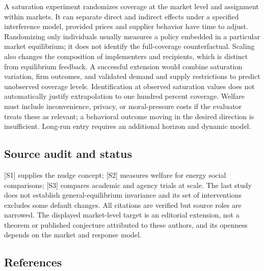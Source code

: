 \documentclass[11pt,a4paper]{article}
\begin{document}
A saturation experiment randomizes coverage at the market level and assignment within markets. It can separate direct and indirect effects under a specified interference model, provided prices and supplier behavior have time to adjust. Randomizing only individuals usually measures a policy embedded in a particular market equilibrium; it does not identify the full-coverage counterfactual. Scaling also changes the composition of implementers and recipients, which is distinct from equilibrium feedback. A successful extension would combine saturation variation, firm outcomes, and validated demand and supply restrictions to predict unobserved coverage levels. Identification at observed saturation values does not automatically justify extrapolation to one hundred percent coverage. Welfare must include inconvenience, privacy, or moral-pressure costs if the evaluator treats these as relevant; a behavioral outcome moving in the desired direction is insufficient. Long-run entry requires an additional horizon and dynamic model.

\subsection*{Source audit and status}

[S1] supplies the nudge concept; [S2] measures welfare for energy social comparisons; [S3] compares academic and agency trials at scale. The last study does not establish general-equilibrium invariance and its set of interventions excludes some default changes. All citations are verified but source roles are narrowed. The displayed market-level target is an editorial extension, not a theorem or published conjecture attributed to these authors, and its openness depends on the market and response model.

\subsection*{References}
\end{document}
